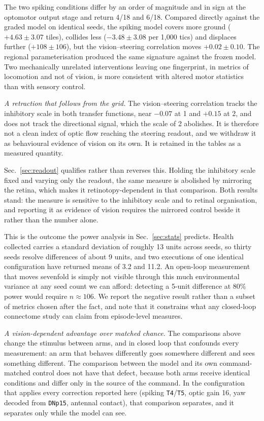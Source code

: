 \documentclass[10pt,twoside]{article}
\newcommand{\cell}[1]{\texttt{#1}}
\begin{document}
The two spiking conditions differ by an order of magnitude and in sign at the
optomotor output stage and return 4/18 and 6/18. Compared directly against the
graded model on identical seeds, the spiking model covers more ground
($+4.63\pm3.07$ tiles), collides less ($-3.48\pm3.08$ per 1{,}000 tics) and
displaces further ($+108\pm106$), but the vision--steering correlation moves
$+0.02\pm0.10$. The regional parameterisation produced the same signature
against the frozen model. Two mechanically unrelated interventions leaving one
fingerprint, in metrics of locomotion and not of vision, is more consistent
with altered motor statistics than with sensory control.

\emph{A retraction that follows from the grid.} The vision--steering
correlation tracks the inhibitory scale in both transfer functions, near
$-0.07$ at 1 and $+0.15$ at 2, and does not track the directional signal,
which the scale of 2 abolishes. It is therefore not a clean index of optic
flow reaching the steering readout, and we withdraw it as behavioural evidence
of vision on its own. It is retained in the tables as a measured quantity.

Sec.~\ref{sec:readout} qualifies rather than reverses this. Holding the
inhibitory scale fixed and varying only the readout, the same measure is
abolished by mirroring the retina, which makes it retinotopy-dependent in that
comparison. Both results stand: the measure is sensitive to the inhibitory
scale and to retinal organisation, and reporting it as evidence of vision
requires the mirrored control beside it rather than the number alone.

This is the outcome the power analysis in Sec.~\ref{sec:stats} predicts.
Health collected carries a standard deviation of roughly 13 units across seeds,
so thirty seeds resolve differences of about 9 units, and two executions of one
identical configuration have returned means of 3.2 and 11.2. An open-loop
measurement that moves sevenfold is simply not visible through this much
environmental variance at any seed count we can afford: detecting a 5-unit
difference at 80\% power would require $n\approx106$. We report the negative
result rather than a subset of metrics chosen after the fact, and note that it
constrains what any closed-loop connectome study can claim from episode-level
measures.

\emph{A vision-dependent advantage over matched chance.} The comparisons above
change the stimulus between arms, and in closed loop that confounds every
measurement: an arm that behaves differently goes somewhere different and sees
something different. The comparison between the model and its own
command-matched control does not have that defect, because both arms receive
identical conditions and differ only in the source of the command. In the
configuration that applies every correction reported here (spiking
\cell{T4}/\cell{T5}, optic gain 16, yaw decoded from \cell{DNp15}, antennal
contact), that comparison separates, and it separates only while the model can
see.
\end{document}
